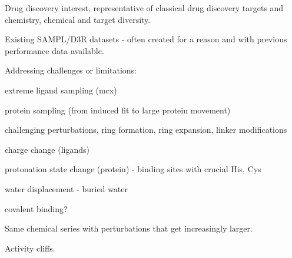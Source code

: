 \documentclass[9pt,bestpractices]{livecoms}
\begin{document}
Drug discovery interest, representative of classical drug discovery targets and chemistry, chemical and target diversity.

Existing SAMPL/D3R datasets - often created for a reason and with previous performance data available.


Addressing challenges or limitations:

extreme ligand sampling (mcx)

protein sampling (from induced fit to large protein movement)

challenging perturbations, ring formation, ring expansion, linker modifications

charge change (ligands)

protonation state change (protein) - binding sites with crucial His, Cys

water displacement - buried water

covalent binding?

Same chemical series with perturbations that get increasingly larger.

Activity cliffs.






\end{document}
